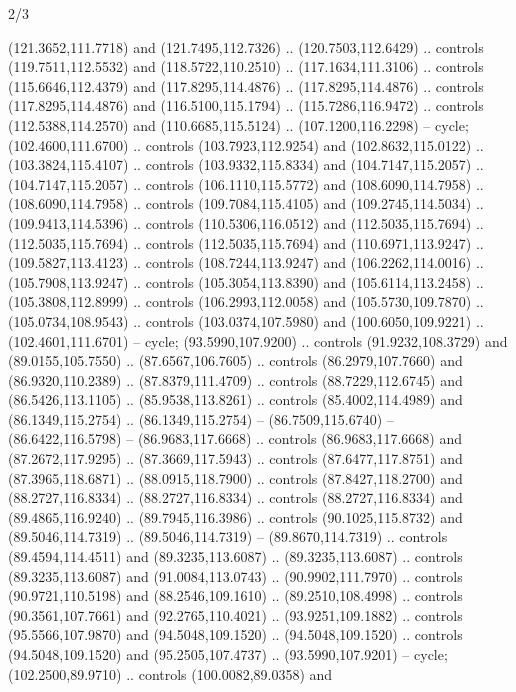 \begin{flagdescription}{2/3}
\begin{scope}[scale=0.00214\flagwidth,yshift=164.5mm]
\begin{scope}[y=-0.8pt, x=0.8pt, inner sep=0pt, outer sep=0pt]
\begin{scope}[draw=black,fill=dark,line width=0.162pt]
  (121.3652,111.7718) and (121.7495,112.7326) .. (120.7503,112.6429) .. controls
  (119.7511,112.5532) and (118.5722,110.2510) .. (117.1634,111.3106) .. controls
  (115.6646,112.4379) and (117.8295,114.4876) .. (117.8295,114.4876) .. controls
  (117.8295,114.4876) and (116.5100,115.1794) .. (115.7286,116.9472) .. controls
  (112.5388,114.2570) and (110.6685,115.5124) .. (107.1200,116.2298) -- cycle;
 (102.4600,111.6700) .. controls (103.7923,112.9254) and
  (102.8632,115.0122) .. (103.3824,115.4107) .. controls (103.9332,115.8334) and
  (104.7147,115.2057) .. (104.7147,115.2057) .. controls (106.1110,115.5772) and
  (108.6090,114.7958) .. (108.6090,114.7958) .. controls (109.7084,115.4105) and
  (109.2745,114.5034) .. (109.9413,114.5396) .. controls (110.5306,116.0512) and
  (112.5035,115.7694) .. (112.5035,115.7694) .. controls (112.5035,115.7694) and
  (110.6971,113.9247) .. (109.5827,113.4123) .. controls (108.7244,113.9247) and
  (106.2262,114.0016) .. (105.7908,113.9247) .. controls (105.3054,113.8390) and
  (105.6114,113.2458) .. (105.3808,112.8999) .. controls (106.2993,112.0058) and
  (105.5730,109.7870) .. (105.0734,108.9543) .. controls (103.0374,107.5980) and
  (100.6050,109.9221) .. (102.4601,111.6701) -- cycle;
 (93.5990,107.9200) .. controls (91.9232,108.3729) and
  (89.0155,105.7550) .. (87.6567,106.7605) .. controls (86.2979,107.7660) and
  (86.9320,110.2389) .. (87.8379,111.4709) .. controls (88.7229,112.6745) and
  (86.5426,113.1105) .. (85.9538,113.8261) .. controls (85.4002,114.4989) and
  (86.1349,115.2754) .. (86.1349,115.2754) -- (86.7509,115.6740) --
  (86.6422,116.5798) -- (86.9683,117.6668) .. controls (86.9683,117.6668) and
  (87.2672,117.9295) .. (87.3669,117.5943) .. controls (87.6477,117.8751) and
  (87.3965,118.6871) .. (88.0915,118.7900) .. controls (87.8427,118.2700) and
  (88.2727,116.8334) .. (88.2727,116.8334) .. controls (88.2727,116.8334) and
  (89.4865,116.9240) .. (89.7945,116.3986) .. controls (90.1025,115.8732) and
  (89.5046,114.7319) .. (89.5046,114.7319) -- (89.8670,114.7319) .. controls
  (89.4594,114.4511) and (89.3235,113.6087) .. (89.3235,113.6087) .. controls
  (89.3235,113.6087) and (91.0084,113.0743) .. (90.9902,111.7970) .. controls
  (90.9721,110.5198) and (88.2546,109.1610) .. (89.2510,108.4998) .. controls
  (90.3561,107.7661) and (92.2765,110.4021) .. (93.9251,109.1882) .. controls
  (95.5566,107.9870) and (94.5048,109.1520) .. (94.5048,109.1520) .. controls
  (94.5048,109.1520) and (95.2505,107.4737) .. (93.5990,107.9201) -- cycle;
 (102.2500,89.9710) .. controls (100.0082,89.0358) and

\end{scope}
\end{scope}
\end{scope}
\end{flagdescription}
